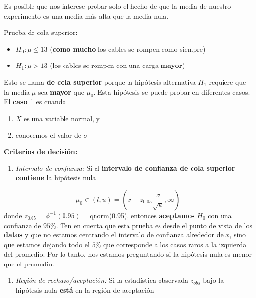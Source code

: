 \documentclass[
]{book}
\providecommand{\tightlist}{%
  \setlength{\itemsep}{0pt}\setlength{\parskip}{0pt}}
\begin{document}
Es posible que nos interese probar solo el hecho de que la media de nuestro experimento es una media más alta que la media nula.

Prueba de cola superior:

\begin{itemize}
\tightlist
\item
  \(H_0:\mu \leq 13\) (\textbf{como mucho} los cables se rompen como siempre)
\item
  \(H_1:\mu > 13\) (los cables se rompen con una carga \textbf{mayor})
\end{itemize}

Esto se llama \textbf{de cola superior} porque la hipótesis alternativa \(H_1\) requiere que la media \(\mu\) sea \textbf{mayor} que \(\mu_0\). Esta hipótesis se puede probar en diferentes casos. El \textbf{caso 1} es cuando

\begin{enumerate}
\def\labelenumi{\arabic{enumi}.}
\tightlist
\item
  \(X\) es una variable normal, y
\item
  conocemos el valor de \(\sigma\)
\end{enumerate}

\textbf{Criterios de decisión:}

\begin{enumerate}
\def\labelenumi{\arabic{enumi}.}
\tightlist
\item
  \emph{Intervalo de confianza:} Si el \textbf{intervalo de confianza de cola superior} \textbf{contiene} la hipótesis nula
\end{enumerate}

\[\mu_0\in (l,u)=(\bar{x}-z_{0.05} \frac{\sigma}{\sqrt{n}}, \infty)\]
donde \(z_{0.05}=\phi^{-1}(0.95)=\)qnorm(0.95), entonces \textbf{aceptamos} \(H_0\) con una confianza de \(95\%\). Ten en cuenta que esta prueba es desde el punto de vista de los \textbf{datos} y que no estamos centrando el intervalo de confianza alrededor de \(\bar{x}\), sino que estamos dejando todo el \(5\%\) que corresponde a los casos raros a la izquierda del promedio. Por lo tanto, nos estamos preguntando si la hipótesis nula es menor que el promedio.

\begin{enumerate}
\def\labelenumi{\arabic{enumi}.}
\setcounter{enumi}{1}
\tightlist
\item
  \emph{Región de rechazo/aceptación:} Si la estadística observada \(z_{obs}\) bajo la hipótesis nula \textbf{está} en la región de aceptación
\end{enumerate}
\end{document}
